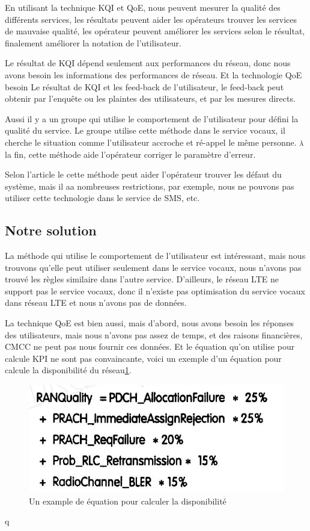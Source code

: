 En utilisant la technique KQI et QoE, nous peuvent mesurer la qualité des différents services, les résultats peuvent aider les opérateurs trouver les services de mauvaise qualité, les opérateur peuvent améliorer les services selon le résultat, finalement améliorer la notation de l'utilisateur.  

Le résultat de KQI dépend seulement aux performances du réseau, donc nous avons besoin les informations des performances de réseau. Et la technologie QoE besoin Le résultat de KQI et les feed-back de l'utilisateur, le feed-back peut obtenir par l'enquête ou les plaintes des utilisateurs,  et par les mesures directs.

Aussi il y a un groupe qui utilise le comportement de l'utilisateur pour défini la qualité du service\cite{UB}. Le groupe utilise cette méthode dans le service vocaux, il cherche le situation comme l'utilisateur accroche et ré-appel le même personne. \textsc{à} la fin, cette méthode aide l'opérateur corriger le paramètre d'erreur.

Selon l'article le cette méthode peut aider l'opérateur trouver les défaut du système, mais il aa nombreuses restrictions, par exemple, nous ne pouvons pas utiliser cette technologie dans le service de SMS, etc.

\subsection{Notre solution}

La méthode qui utilise le comportement de l'utilisateur est intéressant, mais nous trouvons qu'elle peut utiliser seulement dans le service vocaux, nous n'avons pas trouvé les règles similaire dans l'autre service. D'ailleurs, le réseau LTE ne support pas le service vocaux, donc il n'existe pas optimisation du service vocaux dans réseau LTE et nous n'avons pas de données.

La technique QoE est bien aussi, mais d'abord, nous avons besoin les réponses des utilisateurs, mais nous n'avons pas assez de temps, et des raisons financières, CMCC ne peut pas nous fournir ces données. Et le équation qu'on utilise pour calcule KPI ne sont pas convaincante, voici un exemple d'un équation pour calcule la disponibilité du réseau\ref{fig:kpi}. 
\begin{figure}[H]
\centering
\includegraphics[width=0.7\linewidth]{images/kpi}
\caption{Un example de équation pour calculer la disponibilité}
\label{fig:kpi}
\end{figure}


q





















